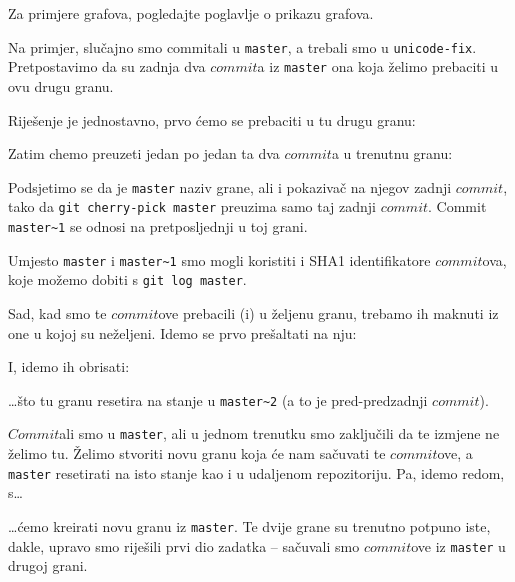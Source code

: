 Za primjere grafova, pogledajte poglavlje o prikazu grafova.


Na primjer, slučajno smo commitali u \verb+master+, a trebali smo u \verb+unicode-fix+.
Pretpostavimo da su zadnja dva $commit$a iz \verb+master+ ona koja želimo prebaciti u ovu drugu granu.

Riješenje je jednostavno, prvo ćemo se prebaciti u tu drugu granu:


Zatim chemo preuzeti jedan po jedan ta dva $commit$a u trenutnu granu:


Podsjetimo se da je \verb+master+ naziv grane, ali i pokazivač na njegov zadnji $commit$, tako da \verb+git cherry-pick master+ preuzima samo taj zadnji $commit$.
Commit \verb+master~1+ se odnosi na pretposljednji u toj grani.

Umjesto \verb+master+ i \verb+master~1+ smo mogli koristiti i SHA1 identifikatore $commit$ova, koje možemo dobiti s \verb+git log master+.

Sad, kad smo te $commit$ove prebacili (i) u željenu granu, trebamo ih maknuti iz one u kojoj su neželjeni.
Idemo se prvo prešaltati na nju:


I, idemo ih obrisati:


\dots{}što tu granu resetira na stanje u \verb+master~2+ (a to je pred-predzadnji $commit$).


$Commit$ali smo u \verb+master+, ali u jednom trenutku smo zaključili da te izmjene ne želimo tu.
Želimo stvoriti novu granu koja će nam sačuvati te $commit$ove, a \verb+master+ resetirati na isto stanje kao i u udaljenom repozitoriju.
Pa, idemo redom, s\dots


\dots{}ćemo kreirati novu granu iz \verb+master+.
Te dvije grane su trenutno potpuno iste, dakle, upravo smo riješili prvi dio zadatka -- sačuvali smo $commit$ove iz \verb+master+ u drugoj grani.

